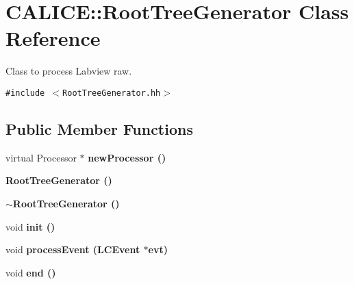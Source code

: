\section{CALICE::Root\-Tree\-Generator Class Reference}
\label{classCALICE_1_1RootTreeGenerator}
Class to process Labview raw.  


{\tt \#include $<$Root\-Tree\-Generator.hh$>$}

\subsection*{Public Member Functions}
\begin{CompactItemize}
\item 
virtual Processor $\ast$ \bf{new\-Processor} ()\label{classCALICE_1_1RootTreeGenerator_35c76a03046c6a38b70986e61dab0e90}

\item 
\bf{Root\-Tree\-Generator} ()\label{classCALICE_1_1RootTreeGenerator_e38c9fd758ddb3a831223ef8765bd3b7}

\item 
\bf{$\sim$Root\-Tree\-Generator} ()\label{classCALICE_1_1RootTreeGenerator_554b4a05c12440db73bc92cb40940af5}

\item 
void \bf{init} ()\label{classCALICE_1_1RootTreeGenerator_ef505539cc3a166184a96b6a597b2142}

\item 
void \bf{process\-Event} (LCEvent $\ast$evt)\label{classCALICE_1_1RootTreeGenerator_a0434517c132655d99986dc9c61ccd92}

\item 
void \bf{end} ()\label{classCALICE_1_1RootTreeGenerator_84611f449c049d1e85df92c902800c65}

\end{CompactItemize}
